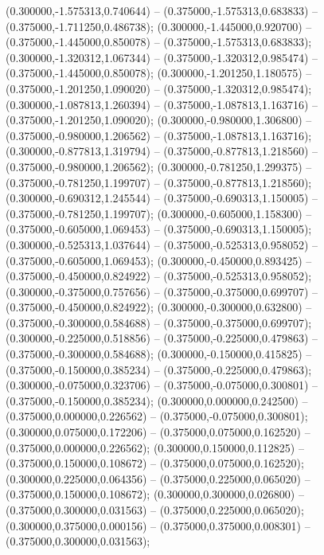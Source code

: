  (0.300000,-1.575313,0.740644) -- (0.375000,-1.575313,0.683833) -- (0.375000,-1.711250,0.486738);
 (0.300000,-1.445000,0.920700) -- (0.375000,-1.445000,0.850078) -- (0.375000,-1.575313,0.683833);
 (0.300000,-1.320312,1.067344) -- (0.375000,-1.320312,0.985474) -- (0.375000,-1.445000,0.850078);
 (0.300000,-1.201250,1.180575) -- (0.375000,-1.201250,1.090020) -- (0.375000,-1.320312,0.985474);
 (0.300000,-1.087813,1.260394) -- (0.375000,-1.087813,1.163716) -- (0.375000,-1.201250,1.090020);
 (0.300000,-0.980000,1.306800) -- (0.375000,-0.980000,1.206562) -- (0.375000,-1.087813,1.163716);
 (0.300000,-0.877813,1.319794) -- (0.375000,-0.877813,1.218560) -- (0.375000,-0.980000,1.206562);
 (0.300000,-0.781250,1.299375) -- (0.375000,-0.781250,1.199707) -- (0.375000,-0.877813,1.218560);
 (0.300000,-0.690312,1.245544) -- (0.375000,-0.690313,1.150005) -- (0.375000,-0.781250,1.199707);
 (0.300000,-0.605000,1.158300) -- (0.375000,-0.605000,1.069453) -- (0.375000,-0.690313,1.150005);
 (0.300000,-0.525313,1.037644) -- (0.375000,-0.525313,0.958052) -- (0.375000,-0.605000,1.069453);
 (0.300000,-0.450000,0.893425) -- (0.375000,-0.450000,0.824922) -- (0.375000,-0.525313,0.958052);
 (0.300000,-0.375000,0.757656) -- (0.375000,-0.375000,0.699707) -- (0.375000,-0.450000,0.824922);
 (0.300000,-0.300000,0.632800) -- (0.375000,-0.300000,0.584688) -- (0.375000,-0.375000,0.699707);
 (0.300000,-0.225000,0.518856) -- (0.375000,-0.225000,0.479863) -- (0.375000,-0.300000,0.584688);
 (0.300000,-0.150000,0.415825) -- (0.375000,-0.150000,0.385234) -- (0.375000,-0.225000,0.479863);
 (0.300000,-0.075000,0.323706) -- (0.375000,-0.075000,0.300801) -- (0.375000,-0.150000,0.385234);
 (0.300000,0.000000,0.242500) -- (0.375000,0.000000,0.226562) -- (0.375000,-0.075000,0.300801);
 (0.300000,0.075000,0.172206) -- (0.375000,0.075000,0.162520) -- (0.375000,0.000000,0.226562);
 (0.300000,0.150000,0.112825) -- (0.375000,0.150000,0.108672) -- (0.375000,0.075000,0.162520);
 (0.300000,0.225000,0.064356) -- (0.375000,0.225000,0.065020) -- (0.375000,0.150000,0.108672);
 (0.300000,0.300000,0.026800) -- (0.375000,0.300000,0.031563) -- (0.375000,0.225000,0.065020);
 (0.300000,0.375000,0.000156) -- (0.375000,0.375000,0.008301) -- (0.375000,0.300000,0.031563);

